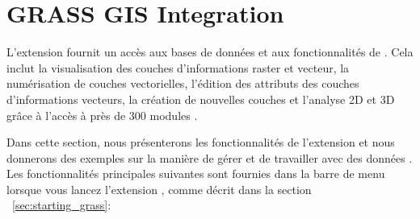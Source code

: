 
\chapter{GRASS GIS Integration}\label{sec:grass}


L'extension \grass fournit un accès aux bases de données et aux fonctionnalités de \grass. Cela inclut la visualisation des couches d'informations \grass raster et vecteur, la numérisation de couches vectorielles, l'édition des attributs des couches d'informations vecteurs, la création de nouvelles couches et l'analyse 2D et 3D grâce à l'accès à près de 300 modules \grass. 

Dans cette section, nous présenterons les fonctionnalités de l'extension et nous donnerons des exemples sur la manière de gérer et de travailler avec des données \grass. Les fonctionnalités principales suivantes sont fournies dans la barre de menu lorsque vous lancez l'extension \grass, comme décrit dans la section ~\ref{sec:starting_grass}:

